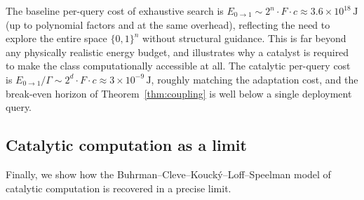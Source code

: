 \documentclass[runningheads]{llncs}
\newcommand{\Erasure}{c}
\begin{document}
The baseline per-query cost of exhaustive search is
$E_{0\to 1}\sim 2^n\cdot F\cdot\Erasure\approx 3.6\times 10^{18}\,
\mathrm{J}$ (up to polynomial factors and at the same overhead), reflecting the need to explore the
entire space $\{0,1\}^n$ without structural guidance. This is far
beyond any physically realistic energy budget, and illustrates why a
catalyst is required to make the class computationally accessible at
all. The catalytic per-query cost is
$E_{0\to 1}/\Gamma\sim 2^d\cdot F\cdot\Erasure\approx 3\times
10^{-9}\,\mathrm{J}$, roughly matching the adaptation cost, and the
break-even horizon of Theorem~\ref{thm:coupling} is well below a
single deployment query.

\subsection{Catalytic computation as a limit}
Finally, we show how the Buhrman--Cleve--Kouck{\'y}--Loff--Speelman model of catalytic computation \cite{buhrman2014computing} is recovered
in a precise limit.
\end{document}
